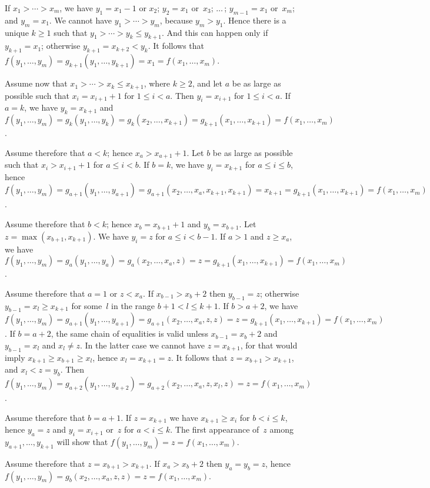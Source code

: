\documentclass{article}
\begin{document}
If $x_1>\cdots >x_m$, we have $y_1=x_1-1$ or $x_2$; $y_2=x_1$ or~$x_3$;
$\ldots\,$; $y_{m-1}=x_1$ or~$x_m$; and $y_m=x_1$. We cannot have
$y_1>\cdots >y_m$, because $y_m>y_1$. Hence there is a unique 
$k\geq 1$ such that $y_1>\cdots >y_k\leq y_{k+1}$. And this can
happen only if $y_{k+1}=x_1$; otherwise $y_{k+1}=x_{k+2}<y_k$.
It follows that $f(y_1,\ldots,y_m)=g_{k+1}(y_1,\ldots,y_{k+1})
=x_1=f(x_1,\ldots,x_m)$.

Assume now that $x_1>\cdots >x_k\leq x_{k+1}$, where $k\geq 2$, and
let $a$ be as large as possible such that $x_i=x_{i+1}+1$ for $1\leq
i<a$. Then $y_i=x_{i+1}$ for $1\leq i<a$. If $a=k$, we have
$y_k=x_{k+1}$ and $f(y_1,\ldots,y_m)=g_k(y_1,\ldots,y_k)=g_k(x_2,\ldots,x_{k+1})=g_{k+1}(x_1,\ldots,x_{k+1})=f(x_1,\ldots,x_m)$.

Assume therefore that $a<k$; hence $x_a>x_{a+1}+1$. Let $b$ be as
large as possible such that $x_i>x_{i+1}+1$ for $a\leq i<b$. 
If $b=k$, we have $y_i=x_{k+1}$ for $a\leq i\leq b$, hence
$f(y_1,\ldots,y_m)=g_{a+1}(y_1,\ldots,y_{a+1})=g_{a+1}(x_2,\ldots,
x_a,x_{k+1},x_{k+1})=x_{k+1}=g_{k+1}(x_1,\ldots,x_{k+1})=
f(x_1,\ldots,x_m)$.

Assume therefore that $b<k$; hence $x_b=x_{b+1}+1$ and $y_b=x_{b+1}$.
Let $z=\max(x_{b+1},x_{k+1})$. We have $y_i=z$ for $a\leq i<b-1$.
If $a>1$ and $z\geq x_a$, we have $f(y_1,\ldots,y_m)=g_a(y_1,\ldots,
y_a)=g_a(x_2,\ldots,x_a,z)=z=g_{k+1}(x_1,\ldots,x_{k+1})=
f(x_1,\ldots,x_m)$.

Assume therefore that $a=1$ or $z<x_a$. If $x_{b-1}>x_b+2$ then
$y_{b-1}=z$; otherwise $y_{b-1}=x_l\geq x_{k+1}$ for some~$l$ in the
range $b+1<l\leq k+1$. If $b>a+2$, we have $f(y_1,\ldots,y_m)=
g_{a+1}(y_1,\ldots,y_{a+1})=g_{a+1}(x_2,\ldots,x_a,z,z)=z=g_{k+1}
(x_1,\ldots,x_{k+1})=f(x_1,\ldots,x_m)$. If $b=a+2$, the same chain
of equalities is valid unless $x_{b-1}=x_b+2$ and $y_{b-1}=x_l$ and
$x_l\not= z$. In the latter case we cannot have $z=x_{k+1}$, for that
would imply $x_{k+1}\geq x_{b+1}\geq x_l$, hence ${x_l=x_{k+1}=z}$.
It follows that $z=x_{b+1}>x_{k+1}$, and $x_l<z=y_b$. Then
$f(y_1,\ldots,y_m)=g_{a+2}(y_1,\ldots,y_{a+2})=g_{a+2}(x_2,\ldots,
x_a,z,x_l,z)=z=f(x_1,\ldots,x_m)$.

Assume therefore that $b=a+1$. If $z=x_{k+1}$ we have $x_{k+1}\geq
x_i$ for $b<i\leq k$, hence $y_a=z$ and $y_i=x_{i+1}$ or~$z$ for
$a<i\leq k$. The first appearance of~$z$ among $y_{a+1},\ldots,
y_{k+1}$ will show that $f(y_1,\ldots,y_m)=z=f(x_1,\ldots,x_m)$.

Assume therefore that $z=x_{b+1}>x_{k+1}$. If $x_a>x_b+2$ then
$y_a=y_b=z$, hence $f(y_1,\ldots,y_m)=g_b(x_2,\ldots,x_a,z,z)
=z=f(x_1,\ldots,x_m)$.
\end{document}
